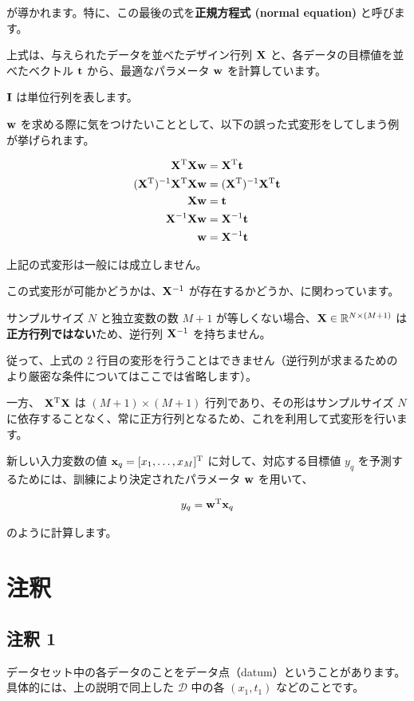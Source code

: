 が導かれます。特に、この最後の式を\textbf{正規方程式 (normal equation)} と呼びます。

上式は、与えられたデータを並べたデザイン行列 ${\bf X}$ と、各データの目標値を並べたベクトル ${\bf t}$ から、最適なパラメータ ${\bf w}$ を計算しています。

${\bf I}$ は単位行列を表します。


${\bf w}$ を求める際に気をつけたいこととして、以下の誤った式変形をしてしまう例が挙げられます。


\[
\begin{aligned}
{\bf X}^{\rm T}{\bf X}{\bf w} &= {\bf X}^{\rm T}{\bf t} \\
({\bf X}^{\rm T})^{-1} {\bf X}^{\rm T}{\bf X}{\bf w} &= ({\bf X}^{\rm T})^{-1} {\bf X}^{\rm T}{\bf t} \\
{\bf X}{\bf w} &= {\bf t} \\
{\bf X}^{-1}{\bf X}{\bf w} &= {\bf X}^{-1}{\bf t} \\
{\bf w} &= {\bf X}^{-1}{\bf t}
\end{aligned}
\]


上記の式変形は一般には成立しません。

この式変形が可能かどうかは、${\bf X}^{-1}$ が存在するかどうか、に関わっています。

サンプルサイズ $N$ と独立変数の数 $M + 1$ が等しくない場合、${\bf X} \in \mathbb{R}^{N \times (M + 1)}$ は\textbf{正方行列ではない}ため、逆行列 ${\bf X}^{-1}$ を持ちません。

従って、上式の 2 行目の変形を行うことはできません（逆行列が求まるためのより厳密な条件についてはここでは省略します）。


一方、 ${\bf X}^{\rm T}{\bf X}$ は $(M + 1) \times (M + 1)$ 行列であり、その形はサンプルサイズ $N$ に依存することなく、常に正方行列となるため、これを利用して式変形を行います。


新しい入力変数の値 ${\bf x}_q = [x_1, \dots, x_M]^{\rm T}$ に対して、対応する目標値 $y_q$ を予測するためには、訓練により決定されたパラメータ ${\bf w}$ を用いて、


\[
y_q = {\bf w}^{\rm T}{\bf x}_q
\]


のように計算します。


\section{注釈}


\subsection{注釈 1}
\label{21-regression-analysis-note1}


データセット中の各データのことをデータ点（datum）ということがあります。具体的には、上の説明で同上した $\mathcal{D}$ 中の各 $(x_1, t_1)$ などのことです。
